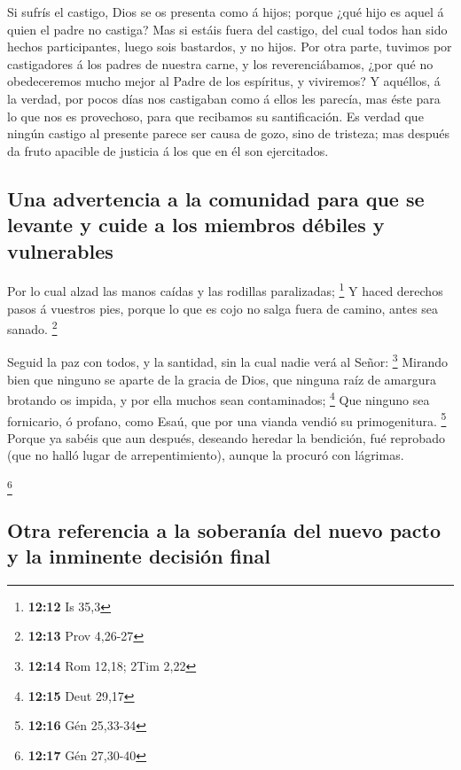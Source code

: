  Si sufrís el castigo, Dios se os presenta como á hijos;
porque ¿qué hijo es aquel á quien el padre no castiga?  Mas
si estáis fuera del castigo, del cual todos han sido hechos
participantes, luego sois bastardos, y no hijos.  Por otra
parte, tuvimos por castigadores á los padres de nuestra carne, y los
reverenciábamos, ¿por qué no obedeceremos mucho mejor al Padre de los
espíritus, y viviremos?  Y aquéllos, á la verdad, por pocos
días nos castigaban como á ellos les parecía, mas éste para lo que nos
es provechoso, para que recibamos su santificación.  Es
verdad que ningún castigo al presente parece ser causa de gozo, sino de
tristeza; mas después da fruto apacible de justicia á los que en él son
ejercitados.

\hypertarget{una-advertencia-a-la-comunidad-para-que-se-levante-y-cuide-a-los-miembros-duxe9biles-y-vulnerables}{%
\subsection{Una advertencia a la comunidad para que se levante y cuide a
los miembros débiles y
vulnerables}\label{una-advertencia-a-la-comunidad-para-que-se-levante-y-cuide-a-los-miembros-duxe9biles-y-vulnerables}}

 Por lo cual alzad las manos caídas y las rodillas
paralizadas; \footnote{\textbf{12:12} Is 35,3}  Y haced
derechos pasos á vuestros pies, porque lo que es cojo no salga fuera de
camino, antes sea sanado. \footnote{\textbf{12:13} Prov 4,26-27}

 Seguid la paz con todos, y la santidad, sin la cual nadie
verá al Señor: \footnote{\textbf{12:14} Rom 12,18; 2Tim 2,22}
 Mirando bien que ninguno se aparte de la gracia de Dios,
que ninguna raíz de amargura brotando os impida, y por ella muchos sean
contaminados; \footnote{\textbf{12:15} Deut 29,17}  Que
ninguno sea fornicario, ó profano, como Esaú, que por una vianda vendió
su primogenitura. \footnote{\textbf{12:16} Gén 25,33-34} 
Porque ya sabéis que aun después, deseando heredar la bendición, fué
reprobado (que no halló lugar de arrepentimiento), aunque la procuró con
lágrimas.

\footnote{\textbf{12:17} Gén 27,30-40}

\hypertarget{otra-referencia-a-la-soberanuxeda-del-nuevo-pacto-y-la-inminente-decisiuxf3n-final}{%
\subsection{Otra referencia a la soberanía del nuevo pacto y la
inminente decisión
final}\label{otra-referencia-a-la-soberanuxeda-del-nuevo-pacto-y-la-inminente-decisiuxf3n-final}}


